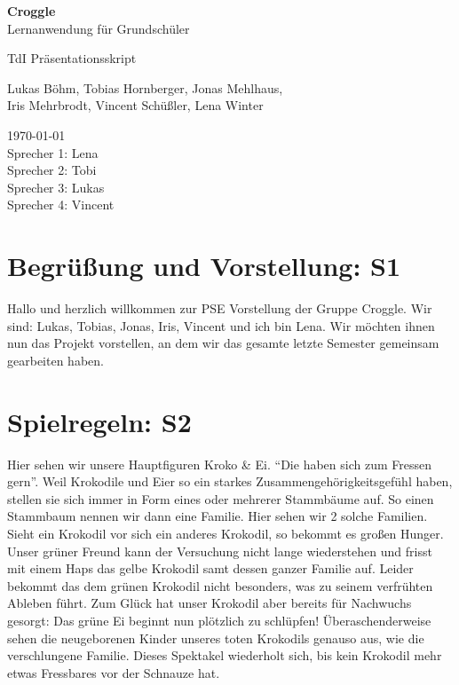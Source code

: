 \documentclass{scrartcl}
\begin{document}
	\begin{titlepage}
		\begin{center}
			{\huge \bfseries Croggle}\\[0.1cm]
			{\large  Lernanwendung für Grundschüler}
		\end{center}


		\begin{center}
			{\Large TdI Präsentationsskript}\\[0.5cm]
		\end{center}
		\begin{center}
			{Lukas Böhm, Tobias Hornberger, Jonas Mehlhaus, \\ Iris Mehrbrodt, Vincent Schüßler, Lena Winter} \\[1cm]
		\end{center}

		\begin{center}
			{\large \today \\
				Sprecher 1: Lena \\
				Sprecher 2:	Tobi \\
				Sprecher 3: Lukas \\
				Sprecher 4: Vincent
			}
		\end{center}
	\end{titlepage}

	\section{Begrüßung und Vorstellung: S1}
	Hallo und herzlich willkommen zur PSE Vorstellung der Gruppe Croggle.
	Wir sind: Lukas, Tobias, Jonas, Iris, Vincent und ich bin Lena.
	Wir möchten ihnen nun das Projekt vorstellen, an dem wir das gesamte letzte Semester gemeinsam gearbeiten haben.

	\section{Spielregeln: S2} 
	Hier sehen wir unsere Hauptfiguren Kroko \& Ei.
	"`Die haben sich zum Fressen gern"'.
	Weil Krokodile und Eier so ein starkes Zusammengehörigkeitsgefühl haben, stellen sie sich immer in Form eines oder mehrerer Stammbäume auf.
	So einen Stammbaum nennen wir dann eine Familie.
	Hier sehen wir 2 solche Familien.	
	Sieht ein Krokodil vor sich ein anderes Krokodil, so bekommt es großen Hunger. Unser grüner Freund kann der Versuchung nicht lange wiederstehen und frisst mit einem Haps das gelbe Krokodil samt dessen ganzer Familie auf.
	Leider bekommt das dem grünen Krokodil nicht besonders, was zu seinem verfrühten Ableben führt.
	Zum Glück hat unser Krokodil aber bereits für Nachwuchs gesorgt: Das grüne Ei beginnt nun plötzlich zu schlüpfen!
	Überaschenderweise sehen die neugeborenen Kinder unseres toten Krokodils genauso aus, wie die verschlungene Familie.
	Dieses Spektakel wiederholt sich, bis kein Krokodil mehr etwas Fressbares vor der Schnauze hat.
\end{document}
